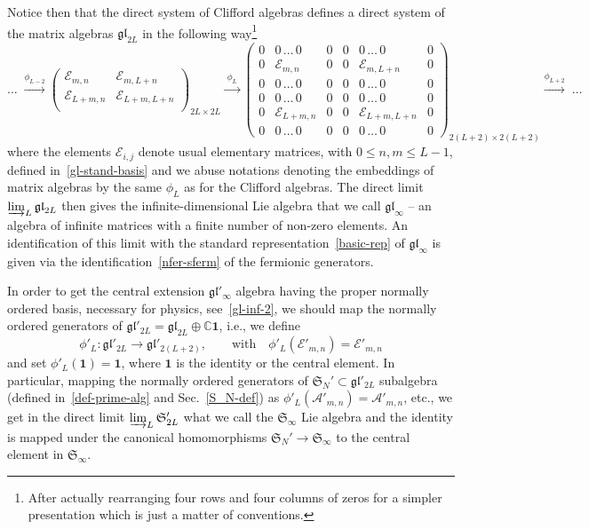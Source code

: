 \documentclass[11pt]{article}
\newcommand{\one}{\boldsymbol{1}}%
\newcommand{\oC}{\mathbb{C}}
\newcommand{\interLie}{\mathfrak{S}}
\newcommand{\interfin}[1]{\interLie_{#1}}
\newcommand{\glinf}{\gl_{\infty}}
\newcommand{\interinfin}{\interLie_{\infty}}
\newcommand{\Asp}{\mathcal{A}}
\newcommand{\Egl}{\mathcal{E}}
\newcommand{\gl}{\mathfrak{gl}}
\newcommand{\ssp}{\mathfrak{sp}}
\theoremstyle{definition}
\begin{document}
Notice then that the direct system of Clifford algebras defines a direct system of the matrix algebras $\gl_{2L}$ in the following way\footnote{After actually rearranging four rows and four columns of zeros for a simpler presentation which is just a matter of conventions.}
\begin{equation*}
\dots \; \xrightarrow{\phi_{L-2}}
\begin{pmatrix}
  \Egl_{m,n} &     \Egl_{m,L+n}   \\
\Egl_{L+m,n}    &    \Egl_{L+m,L+n} \\
\end{pmatrix}_{2L\times 2L}
 \xrightarrow{\;\phi_L\;}
\begin{pmatrix}
0 & 0\,\dots\,0 &         0   & 0   &  0\,\dots\,0   &  0\\
0 & \Egl_{m,n} & 0 & 0    & \Egl_{m,L+n}    & 0\\
 0 & 0\,\dots\,0 &     0       &0   &      0\,\dots\,0  & 0 \\
0 & 0\,\dots\,0 & 0    & 0  & 0\,\dots\,0 &  0 \\
0 & \Egl_{L+m,n} & 0   & 0  &  \Egl_{L+m,L+n} &0 \\
0 & 0\,\dots\,0 &      0      & 0  &  0\,\dots\,0 &    0
\end{pmatrix}_{2(L+2)\times 2(L+2)}
\!\!\!\!\!\!\! \xrightarrow{\phi_{L+2}} \; \dots
\end{equation*}
where the elements $\Egl_{i,j}$ denote usual elementary matrices, with $0\leq n,m\leq L-1$,  defined in~\eqref{gl-stand-basis}
and we abuse notations denoting the embeddings of matrix algebras by the same $\phi_L$ as for the Clifford algebras. The direct limit $\varinjlim_L \gl_{2L}$ then gives the infinite-dimensional Lie algebra that we call $\glinf$ -- an algebra of infinite matrices  with a finite number of non-zero elements. An identification of this limit with the standard representation~\eqref{basic-rep} of $\glinf$ is given via the identification~\eqref{nfer-sferm} of the fermionic generators.

In order to get the central extension $\gl'_{\infty}$  algebra  having  the proper normally ordered basis, necessary for physics, see~\eqref{gl-inf-2}, we should
 map the normally ordered generators of $\gl'_{2L}=\gl_{2L}\oplus\oC\one$, i.e., we define
\begin{equation}\label{phi-prime}
\phi'_L:\gl'_{2L}\to\gl'_{2(L+2)},\qquad \text{with}\quad
  \phi'_L(\Egl'_{m,n})=\Egl'_{m,n}
\end{equation}
   and set $\phi'_L(\one)=\one$, where $\one$ is the identity or the central element.
In particular, mapping   the normally ordered generators of $\interfin{N}'\subset\gl'_{2L}$ subalgebra (defined in~\eqref{def-prime-alg} and Sec.~\ref{S_N-def})  as
  $\phi'_L(\Asp'_{m,n})=\Asp'_{m,n}$, etc.,
we get in the direct limit $\varinjlim_L \interfin{2L}'$
what we call the $\interinfin$ Lie algebra
 and the identity is mapped under the canonical homomorphisms $\interfin{N}'\to\interinfin$  to the central element in $\interinfin$.
\end{document}
